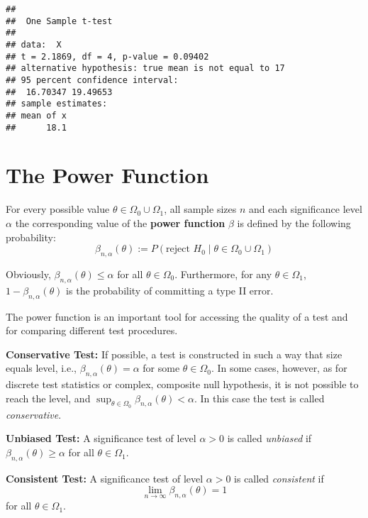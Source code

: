 \documentclass[
]{book}
\begin{document}
\begin{verbatim}
## 
##  One Sample t-test
## 
## data:  X
## t = 2.1869, df = 4, p-value = 0.09402
## alternative hypothesis: true mean is not equal to 17
## 95 percent confidence interval:
##  16.70347 19.49653
## sample estimates:
## mean of x 
##      18.1
\end{verbatim}

\hypertarget{PF1}{%
\section{The Power Function}\label{PF1}}

For every possible value \(\theta\in\Omega_0\cup\Omega_1\),
all sample sizes \(n\) and
each significance level \(\alpha\) the corresponding value of
the \textbf{power function} \(\beta\) is defined by the following probability:
\[
\beta_{n,\alpha}(\theta):=P(\text{reject } H_0\; |\; \theta\in\Omega_0\cup\Omega_1)
\]

Obviously, \(\beta_{n,\alpha}(\theta)\leq \alpha\) for all \(\theta\in\Omega_0\).
Furthermore, for any \(\theta\in\Omega_1\), \(1-\beta_{n,\alpha}(\theta)\) is the probability of committing a type II error.

\hfill\break

The power function is an important tool for accessing the quality of a test and for comparing different test procedures.

\hfill\break

\textbf{Conservative Test:}
If possible, a test is constructed in such a way that size equals level, i.e.,
\(\beta_{n,\alpha}(\theta)=\alpha\) for some \(\theta\in\Omega_0\).
In some cases, however, as for discrete test statistics or complex, composite null hypothesis, it is not possible to reach the level, and
\(\sup_{\theta\in\Omega_0}\beta_{n,\alpha}(\theta)<\alpha\).
In this case the test is called \emph{conservative}.

\hfill\break

\textbf{Unbiased Test:}
A significance test of level \(\alpha>0\) is called \emph{unbiased} if \(\beta_{n,\alpha}(\theta)\ge\alpha\) for all \(\theta\in\Omega_1\).

\hfill\break

\textbf{Consistent Test:}
A significance test of level \(\alpha>0\) is called \emph{consistent} if
\[\lim_{n\rightarrow \infty} \beta_{n,\alpha}(\theta) =1\]
for all \(\theta\in \Omega_1\).

\hfill\break
\end{document}
